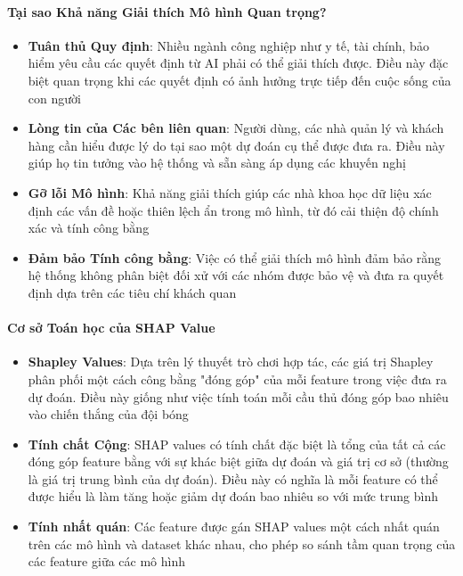 \paragraph{Tại sao Khả năng Giải thích Mô hình Quan trọng?}
\begin{itemize}[leftmargin=*]
    \item \textbf{Tuân thủ Quy định}: Nhiều ngành công nghiệp như y tế, tài chính, bảo hiểm yêu cầu các quyết định từ AI phải có thể giải thích được. Điều này đặc biệt quan trọng khi các quyết định có ảnh hưởng trực tiếp đến cuộc sống của con người
    
    \item \textbf{Lòng tin của Các bên liên quan}: Người dùng, các nhà quản lý và khách hàng cần hiểu được lý do tại sao một dự đoán cụ thể được đưa ra. Điều này giúp họ tin tưởng vào hệ thống và sẵn sàng áp dụng các khuyến nghị
    
    \item \textbf{Gỡ lỗi Mô hình}: Khả năng giải thích giúp các nhà khoa học dữ liệu xác định các vấn đề hoặc thiên lệch ẩn trong mô hình, từ đó cải thiện độ chính xác và tính công bằng
    
    \item \textbf{Đảm bảo Tính công bằng}: Việc có thể giải thích mô hình đảm bảo rằng hệ thống không phân biệt đối xử với các nhóm được bảo vệ và đưa ra quyết định dựa trên các tiêu chí khách quan
\end{itemize}

\paragraph{Cơ sở Toán học của SHAP Value}
\begin{itemize}[leftmargin=*]
    \item \textbf{Shapley Values}: Dựa trên lý thuyết trò chơi hợp tác, các giá trị Shapley phân phối một cách công bằng "đóng góp" của mỗi feature trong việc đưa ra dự đoán. Điều này giống như việc tính toán mỗi cầu thủ đóng góp bao nhiêu vào chiến thắng của đội bóng
    
    \item \textbf{Tính chất Cộng}: SHAP values có tính chất đặc biệt là tổng của tất cả các đóng góp feature bằng với sự khác biệt giữa dự đoán và giá trị cơ sở (thường là giá trị trung bình của dự đoán). Điều này có nghĩa là mỗi feature có thể được hiểu là làm tăng hoặc giảm dự đoán bao nhiêu so với mức trung bình
    
    \item \textbf{Tính nhất quán}: Các feature được gán SHAP values một cách nhất quán trên các mô hình và dataset khác nhau, cho phép so sánh tầm quan trọng của các feature giữa các mô hình
\end{itemize}

